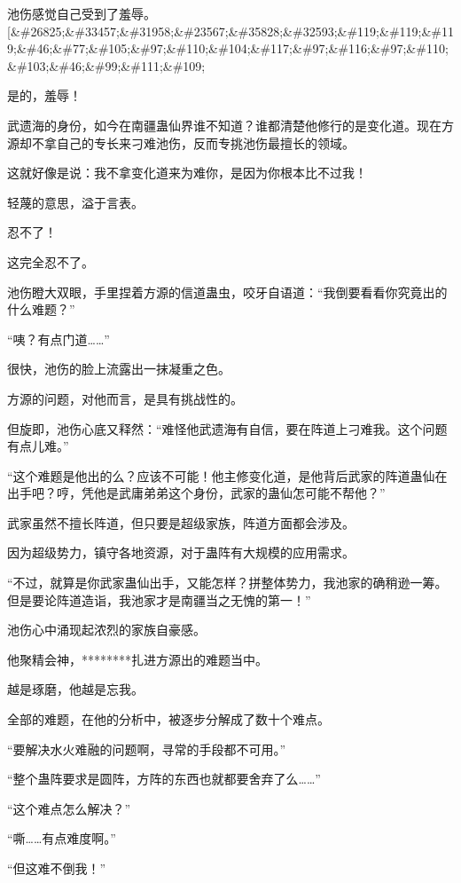 
\begin{this_body}

池伤感觉自己受到了羞辱。[\&\#26825;\&\#33457;\&\#31958;\&\#23567;\&\#35828;\&\#32593;\&\#119;\&\#119;\&\#119;\&\#46;\&\#77;\&\#105;\&\#97;\&\#110;\&\#104;\&\#117;\&\#97;\&\#116;\&\#97;\&\#110;\&\#103;\&\#46;\&\#99;\&\#111;\&\#109;

是的，羞辱！

武遗海的身份，如今在南疆蛊仙界谁不知道？谁都清楚他修行的是变化道。现在方源却不拿自己的专长来刁难池伤，反而专挑池伤最擅长的领域。

这就好像是说：我不拿变化道来为难你，是因为你根本比不过我！

轻蔑的意思，溢于言表。

忍不了！

这完全忍不了。

池伤瞪大双眼，手里捏着方源的信道蛊虫，咬牙自语道：“我倒要看看你究竟出的什么难题？”

“咦？有点门道……”

很快，池伤的脸上流露出一抹凝重之色。

方源的问题，对他而言，是具有挑战性的。

但旋即，池伤心底又释然：“难怪他武遗海有自信，要在阵道上刁难我。这个问题有点儿难。”

“这个难题是他出的么？应该不可能！他主修变化道，是他背后武家的阵道蛊仙在出手吧？哼，凭他是武庸弟弟这个身份，武家的蛊仙怎可能不帮他？”

武家虽然不擅长阵道，但只要是超级家族，阵道方面都会涉及。

因为超级势力，镇守各地资源，对于蛊阵有大规模的应用需求。

“不过，就算是你武家蛊仙出手，又能怎样？拼整体势力，我池家的确稍逊一筹。但是要论阵道造诣，我池家才是南疆当之无愧的第一！”

池伤心中涌现起浓烈的家族自豪感。

他聚精会神，********扎进方源出的难题当中。

越是琢磨，他越是忘我。

全部的难题，在他的分析中，被逐步分解成了数十个难点。

“要解决水火难融的问题啊，寻常的手段都不可用。”

“整个蛊阵要求是圆阵，方阵的东西也就都要舍弃了么……”

“这个难点怎么解决？”

“嘶……有点难度啊。”

“但这难不倒我！”


\end{this_body}
